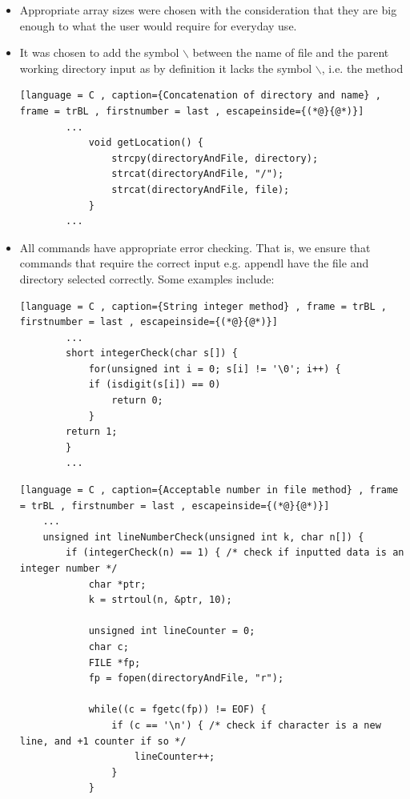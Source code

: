 \documentclass[a4paper]{article}
\theoremstyle{plain}
\theoremstyle{definition}
\theoremstyle{remark}
\begin{document}
\begin{itemize}
\begin{lstlisting}[language = C , caption={Temporary file} , frame = trBL , firstnumber = last , escapeinside={(*@}{@*)}]
			while((c = fgetc(fp)) != EOF) { /* copy the text for all lines in temp except the selected line, where the selected line has selected text inserted to it */
				if (c == '\n') {
					lineCounter++;
				}
				if (lineCounter != lineNumber) {
					fputc(c, temp);
				}
				else {
					fputs("\n", temp); /* to ensure correct spacing */
					fputs(insertLine, temp);
					lineCounter++;
				}
			}
		...
		\end{lstlisting}
	\item Appropriate array sizes were chosen with the consideration that they are big enough to what the user would require for everyday use.
	\item It was chosen to add the symbol $\backslash$ between the name of file and the parent working directory input as by definition it lacks the symbol $\backslash$, i.e. the method
		\begin{lstlisting}[language = C , caption={Concatenation of directory and name} , frame = trBL , firstnumber = last , escapeinside={(*@}{@*)}]
		...
			void getLocation() {
				strcpy(directoryAndFile, directory);
				strcat(directoryAndFile, "/");
				strcat(directoryAndFile, file);
			}
		...
		\end{lstlisting}

	\item All commands have appropriate error checking. That is, we ensure that commands that require the correct input e.g. appendl have the file and directory selected correctly. Some examples include:
		\begin{lstlisting}[language = C , caption={String integer method} , frame = trBL , firstnumber = last , escapeinside={(*@}{@*)}]
		...
		short integerCheck(char s[]) {
			for(unsigned int i = 0; s[i] != '\0'; i++) {
			if (isdigit(s[i]) == 0)
				return 0;
			}
		return 1;
		}	
		...
		\end{lstlisting}
		\begin{lstlisting}[language = C , caption={Acceptable number in file method} , frame = trBL , firstnumber = last , escapeinside={(*@}{@*)}]
	...	
	unsigned int lineNumberCheck(unsigned int k, char n[]) {
		if (integerCheck(n) == 1) { /* check if inputted data is an integer number */
			char *ptr;
			k = strtoul(n, &ptr, 10);

			unsigned int lineCounter = 0; 
			char c; 
			FILE *fp; 
			fp = fopen(directoryAndFile, "r"); 

			while((c = fgetc(fp)) != EOF) {
				if (c == '\n') { /* check if character is a new line, and +1 counter if so */
					lineCounter++;
				}
			}


\end{lstlisting}
\end{itemize}
\end{document}
